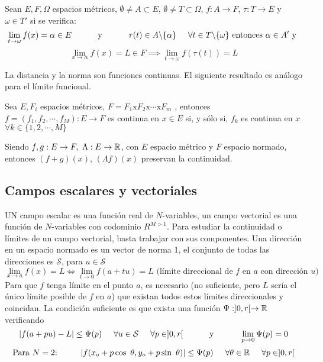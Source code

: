 Sean $E,F,\Omega$ espacios métricos, $\emptyset\not =A\subset E$, $\emptyset\not = T\subset\Omega$, $f:A\rightarrow F$, $\tau: T\rightarrow E$ y $\omega\in T'$ si se verifica:
$$ \lim_{t\rightarrow\omega} f(x) = \alpha\in E \hspace{1cm}\text{ y }\hspace{1cm}
\tau(t) \in A\backslash\{\alpha\} \hspace{0.5cm} \forall t\in T\backslash\{\omega\}\text{ entonces $\alpha\in A'$ y }$$
$$ \lim_{x\rightarrow\alpha} f(x) = L\in F\implies\lim_{t\rightarrow\omega} f(\tau(t)) = L $$

La distancia y la norma son funciones continuas. El siguiente resultado es análogo para el límite funcional.

Sea $E,F_i$ espacios métricos, $F=F_1\text{x}F_2\text{x}\cdots\text{x}F_m$ , entonces $f=(f_1,f_2,\cdots,f_M):E\rightarrow F$ es continua en $x\in E$ si, y sólo si, $f_k$ es continua en $x$ $\forall k\in \{1,2,\cdots,M\}$

Siendo $f,g:E\rightarrow F,\ \Lambda:E\rightarrow\R$, con $E$ espacio métrico y $F$ espacio normado, entonces $(f+g)(x)$, $(\Lambda f)(x)$ preservan la continuidad.

\subsection{Campos escalares y vectoriales}
UN campo escalar es una función real de $N$-variables, un campo vectorial es una función de $N$-variables con codominio $R^{M>1}$. Para estudiar la continuidad o límites de un campo vectorial, basta trabajar con sus componentes.
Una dirección en un espacio normado es un vector de norma 1, el conjunto de todas las direcciones es $\mathcal{S}$, para $u\in\mathcal{S}$
$$ \lim_{x\rightarrow a} f(x) = L \Longleftrightarrow
\lim_{t\rightarrow 0} f(a+tu) = L \text{ (límite direccional de $f$ en $a$ con dirección $u$)}$$
Para que $f$ tenga límite en el punto $a$, es necesario (no suficiente, pero $L$ sería el único límite posible de $f$ en $a$) que existan todos estos límites direccionales y coincidan.
La condición suficiente es que exista una función $\Psi:]0,r[\rightarrow \mathbb{R}$ verificando
$$ |f(a+pu) - L|\leq \Psi(p) \hspace{0.5cm} \forall u\in\mathcal{S}\hspace{0.5cm} \forall p\in]0,r[\hspace{1cm}\text{ y }\hspace{1cm}
\lim_{p\rightarrow 0} \Psi (p)=0$$
$$ \text{Para $N=2$:}\hspace{1cm} |f(x_o+p\cos \ \theta, y_o+p\sin\ \theta)| \leq \Psi (p) \hspace{0.5cm} \forall\theta\in\R\hspace{0.5cm}\forall p\in]0,r[ $$